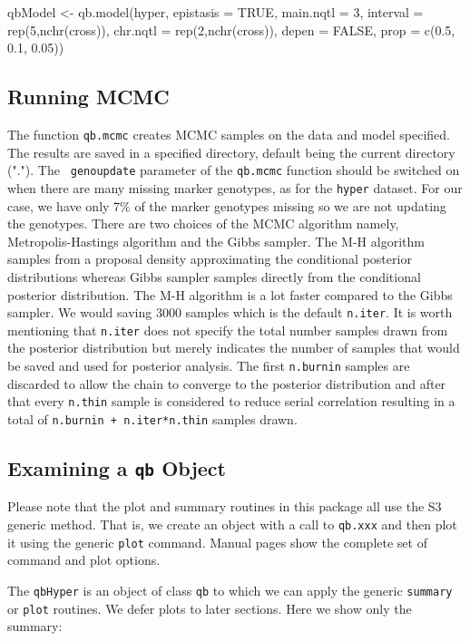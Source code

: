 \documentclass{article}
\begin{document}
\begin{Schunk}
\begin{Sinput}
qbModel <- qb.model(hyper, epistasis = TRUE, main.nqtl = 3, 
  interval = rep(5,nchr(cross)), chr.nqtl = rep(2,nchr(cross)),
  depen = FALSE, prop = c(0.5, 0.1, 0.05))
\end{Sinput}
\end{Schunk}

\subsection{Running MCMC}

The function {\tt qb.mcmc} creates MCMC samples on
the data and model specified. The results are saved in a specified
directory, default being the current directory ("."). The {\tt
genoupdate} parameter of the {\tt qb.mcmc} function should be switched on
when there are many missing marker genotypes, as for the {\tt hyper}
dataset. For our case, we have only 7\% of the marker genotypes
missing so we are not updating the genotypes. There are two choices of
the MCMC algorithm namely, Metropolis-Hastings algorithm and the Gibbs
sampler. The M-H algorithm samples from a proposal density
approximating the conditional posterior distributions whereas Gibbs
sampler samples directly from the conditional posterior
distribution. The M-H algorithm is a lot faster compared to the Gibbs
sampler. We would saving 3000 samples which is the default {\tt n.iter}. It 
is worth mentioning that {\tt n.iter} does not specify the total number samples
drawn from the posterior distribution but merely indicates the number of samples that would be saved and used for posterior analysis. The first {\tt n.burnin} samples are discarded to allow the chain to converge to the posterior distribution and after that every {\tt n.thin} sample is considered to reduce serial
correlation resulting in a total of {\tt n.burnin + n.iter*n.thin} samples drawn.

\subsection{Examining a \texttt{qb} Object}

Please note that the plot and summary routines in this package all use
the S3 generic method. That is, we create an object with a call to
\texttt{qb.xxx} and then plot it using the generic \texttt{plot}
command. Manual pages show the complete set of command and plot
options.

The \texttt{qbHyper} is an object of class \texttt{qb} to which we can
apply the generic \texttt{summary} or \texttt{plot} routines. We defer
plots to later sections. Here we show only the summary:
\end{document}
